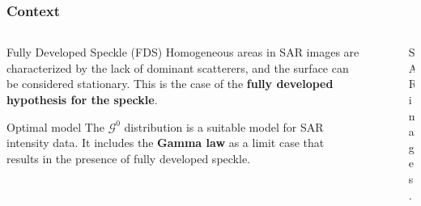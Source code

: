 \documentclass[aspectratio=1610,10pt]{beamer}
\begin{document}
\begin{frame} \frametitle{\large{Context}}\vspace{-0.3cm}	

 \justifying
\begin{columns}[T,onlytextwidth]
    \begin{column}{.55\textwidth}
			\begin{alertblock}{Fully Developed Speckle (FDS)}\justifying
			\vspace{0.4cm}	
Homogeneous areas in SAR images are characterized by the lack of dominant scatterers, and the surface can be considered stationary.
This is the case of the \textbf{fully developed hypothesis for the speckle}.

		 \vspace{0.4cm}	
	\end{alertblock}
	\begin{alertblock}{Optimal model}\justifying
	\vspace{0.2cm}	
		The \(\mathcal{G}^0\) distribution is a suitable model for SAR intensity data. %
		It includes the \textbf{Gamma law} as a limit case that results in the presence of fully developed speckle.


	\end{alertblock}
		
    \end{column}
    \begin{column}{.40\textwidth}\vspace{-0.8cm}
		     \begin{block}{} 
		\justifying
				\begin{figure}[H]
    \centering
    \hfill
    \vspace{-0.4cm}
    \caption*{SAR images.}
    \label{fig:real_SAR_Images_coe}
\end{figure}
\end{block}\vspace{2.8cm}
    \end{column}
\end{columns}\vspace{0.2cm}
       

\end{frame}
\end{document}
